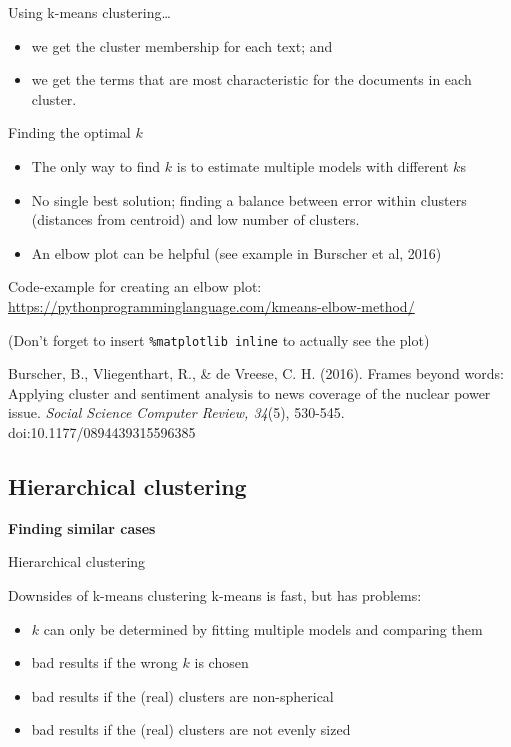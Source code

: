\documentclass{beamer}
\begin{document}
\begin{frame}{Using k-means clustering\ldots}
\begin{itemize}
	\item we get the cluster membership for each text; and
	\item we get the terms that are most characteristic for the documents in each cluster.
\end{itemize}
\end{frame}

\begin{frame}{Finding the optimal $k$}

\begin{itemize}
	\item The only way to find $k$ is to estimate multiple models with different $k$s
	\item No single best solution; finding a balance between error within clusters (distances from centroid) and low number of clusters.
	\item An elbow plot can be helpful (see example in Burscher et al, 2016)
\end{itemize}

\pause

\footnotesize 
Code-example for creating an elbow plot:
\url{https://pythonprogramminglanguage.com/kmeans-elbow-method/}

(Don't forget to insert \texttt{\%matplotlib inline} to actually see the plot)


\tiny{Burscher, B., Vliegenthart, R., \& de Vreese, C. H. (2016). Frames beyond words: Applying cluster and sentiment analysis to news coverage of the
	nuclear power issue.\textit{ Social Science Computer Review, 34}(5), 530-545. doi:10.1177/0894439315596385}
\end{frame}


\subsection{Hierarchical clustering}

\begin{frame}[plain]
\textbf{Finding similar cases}

Hierarchical clustering
\end{frame}

\begin{frame}{Downsides of k-means clustering}
k-means is fast, but has problems:

\begin{itemize}
	\item $k$ can only be determined by fitting multiple models and comparing them
	\item bad results if the wrong $k$ is chosen
	\item bad results if the (real) clusters are non-spherical
	\item bad results if the (real) clusters are not evenly sized
\end{itemize}
\end{frame}
\end{document}
